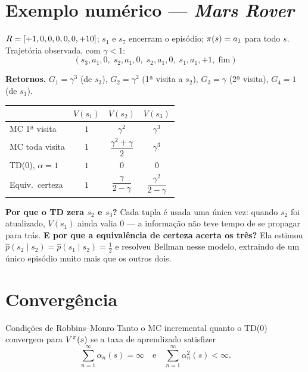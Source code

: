 \documentclass[11pt, a4paper]{article}
\begin{document}
\section{Exemplo numérico — \emph{Mars Rover}}

\begin{center}
\marsrover*{}
\end{center}

$R = [+1,0,0,0,0,0,+10]$; $s_1$ e $s_7$ encerram o episódio;
$\pi(s) = a_1$ para todo $s$. Trajetória observada, com $\gamma<1$:
\[
  (s_3, a_1, 0,\; s_2, a_1, 0,\; s_2, a_1, 0,\; s_1, a_1, +1,\; \text{fim})
\]

\textbf{Retornos.} $G_1 = \gamma^3$ (de $s_3$), $G_2 = \gamma^2$
(1ª visita a $s_2$), $G_3 = \gamma$ (2ª visita), $G_4 = 1$ (de $s_1$).

\begin{center}\footnotesize
\setlength{\tabcolsep}{4pt}
\begin{tabular}{@{}lccc@{}}
  \toprule
  & $V(s_1)$ & $V(s_2)$ & $V(s_3)$\\
  \midrule
  MC 1ª visita   & $1$ & $\gamma^2$ & $\gamma^3$\\
  MC toda visita & $1$ & $\dfrac{\gamma^2+\gamma}{2}$ & $\gamma^3$\\[0.5em]
  TD(0), $\alpha=1$ & $1$ & $0$ & $0$\\[0.35em]
  Equiv.\ certeza & $1$ & $\dfrac{\gamma}{2-\gamma}$ & $\dfrac{\gamma^2}{2-\gamma}$\\
  \bottomrule
\end{tabular}
\end{center}

\textbf{Por que o TD zera $s_2$ e $s_3$?} Cada tupla é usada uma única vez:
quando $s_2$ foi atualizado, $V(s_1)$ ainda valia 0 — a informação não teve
tempo de se propagar para trás. \textbf{E por que a equivalência de certeza
acerta os três?} Ela estimou $\hat p(s_2\!\mid\! s_2) = \hat p(s_1\!\mid\! s_2)
= \tfrac12$ e resolveu Bellman nesse modelo, extraindo de um único episódio
muito mais que os outros dois.

\section{Convergência}

\begin{teobox}{Condições de Robbins--Monro}
  Tanto o MC incremental quanto o TD(0) convergem para $V^{\pi}(s)$ se a taxa de
  aprendizado satisfizer
  \[
    \sum_{n=1}^{\infty}\alpha_n(s) = \infty
    \quad\text{e}\quad
    \sum_{n=1}^{\infty}\alpha_n^2(s) < \infty .
  \]
\end{teobox}
\end{document}
